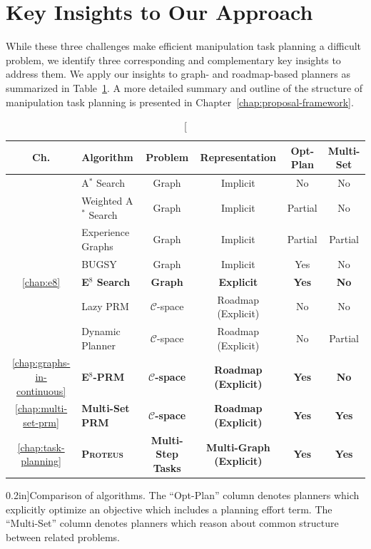 \section*{Key Insights to Our Approach}

While these three challenges make efficient
manipulation task planning a difficult problem,
we identify three corresponding and complementary
key insights to address them.
We apply our insights to graph- and roadmap-based planners
as summarized in Table~\ref{table:intro-algorithms}.
A more detailed summary and outline of the structure of
manipulation task planning is presented in
Chapter~\ref{chap:proposal-framework}.

\begin{table}[t]
   \centering
   {\renewcommand{\arraystretch}{1.1}
   \begin{tabular}{clcccc}
   \toprule
   {\bf Ch.} & Algorithm & Problem & Representation & Opt-Plan & Multi-Set \\
   \midrule
   & A$^*$ Search \citep{hart1968astar} & Graph & Implicit & No & No \\
   & Weighted A$^*$ Search & Graph & Implicit & Partial & No \\
   & Experience Graphs \citep{phillips2012egraphs} & Graph & Implicit & Partial & Partial \\
   & BUGSY \citep{ruml2007bugsy} & Graph & Implicit & Yes & No \\
    \ref{chap:e8}
      & {\bf E$^8$ Search}
      & {\bf Graph} & {\bf Explicit} & {\bf Yes} & {\bf No} \\
   \midrule
   & Lazy PRM \citep{bohlin2000lazyprm} & $\mathcal{C}$-space & Roadmap (Explicit) & No & No \\
   & Dynamic Planner \citep{jaillet2004dynamicprm} & $\mathcal{C}$-space & Roadmap (Explicit) & No & Partial \\
   \ref{chap:graphs-in-continuous}
      & {\bf E$^8$-PRM}
      & {\bf $\mathcal{C}$-space} & {\bf Roadmap (Explicit)} & {\bf Yes} & {\bf No} \\
   \ref{chap:multi-set-prm}
      & {\bf Multi-Set PRM}
      & {\bf $\mathcal{C}$-space} & {\bf Roadmap (Explicit)} & {\bf Yes} & {\bf Yes} \\
   \midrule
   \ref{chap:task-planning}
      & {\bf \textsc{Proteus}}
      & {\bf Multi-Step Tasks} & {\bf Multi-Graph (Explicit)} & {\bf Yes} & {\bf Yes} \\
   \bottomrule
   \end{tabular}
   } %
   \caption[][0.2in]{Comparison of algorithms.
      The ``Opt-Plan'' column denotes planners which explicitly
      optimize an objective which includes a planning effort term.
      The ``Multi-Set'' column denotes planners which reason about
      common structure between related problems.}
   \label{table:intro-algorithms}
\end{table}


